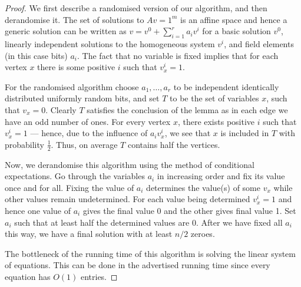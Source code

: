 \documentclass[a4paper,11pt]{article}
\theoremstyle{plain}
\theoremstyle{definition}
\begin{document}
\begin{proof}

    We first describe a randomised version of our algorithm, and then derandomise
    it. The set of solutions to $Av=1^m$ is an affine space and hence a generic solution can be written as $v=v^0+\sum_{i=1}^r a_i v^i$ for a basic solution $v^0$, linearly independent solutions to the homogeneous system $v^i$, and field elements (in this case bits) $a_i$.
    The fact that no variable is fixed implies that for each vertex $x$ there is 
    some positive $i$ such that $v^i_x=1$.
    
     For the randomised algorithm choose $a_1, \ldots, a_r$ to be independent identically distributed uniformly random bits, and set $T$ to be 
     the set of variables $x$, such that $v_x=0$.  Clearly $T$ satisfies
     the conclusion of the lemma as in each edge we have an odd number of ones. 
     For every vertex $x$, there exists positive $i$ such that $v_x^i = 1$ --- hence, due to the influence of $a_i v_x^i$, we see that $x$ is included in $T$ with probability $\frac{1}{2}$.
     Thus, on average $T$ contains half the vertices.

    Now, we derandomise this algorithm using the method of conditional
    expectations. Go through the variables $a_i$ in increasing order and 
    fix its value once and for all.  Fixing the value of $a_i$ determines
    the value(s) of some $v_x$ while other values remain undetermined.  For each
    value being determined $v_x^i=1$ and hence one value of $a_i$ gives
    the final value 0 and the other gives final value 1.  Set $a_i$ such
    that at least half the determined values are 0.  After we have 
    fixed all $a_i$ this way, we have a final solution with at least
    $n/2$ zeroes.
    
    The bottleneck of the running time of this algorithm is solving the linear system of equations. This can be done in the advertised running time since every equation has $O(1)$ entries. 
\end{proof}
\end{document}
